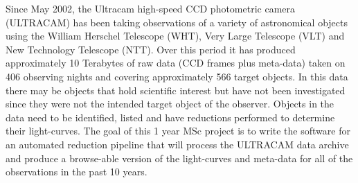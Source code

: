 Since May 2002, the  Ultracam high-speed CCD photometric camera 
(ULTRACAM) has been taking observations of a variety of astronomical 
objects using the William Herschel Telescope (WHT), Very Large 
Telescope (VLT) and New Technology Telescope (NTT). Over this period 
it has produced approximately 10 Terabytes of raw data (CCD frames 
plus meta-data) taken on 406 observing nights and covering 
approximately 566 target objects. In this data there may be objects 
that hold scientific interest but have not been investigated since they were not the intended target object of the observer. 
Objects in the data need to be identified, listed and have 
reductions performed to determine their light-curves. The goal of 
this 1 year MSc project is to write the software for an automated reduction pipeline 
that will process the ULTRACAM data archive and produce a 
browse-able version of the light-curves and meta-data for all of the 
observations in the past 10 years.
